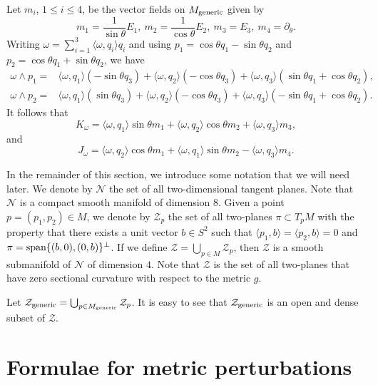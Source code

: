 \documentclass[11pt]{amsart}
\theoremstyle{definition}
\begin{document}
Let $m_i$, $1 \leq i \leq 4$, be the vector fields on $M_{\text{\rm generic}}$ given by
\[
m_1=\frac{1}{\sin\theta} E_1,\ m_2=\frac{1}{\cos\theta} E_2,\ m_3=E_3,\ m_4=\partial_\theta.
\] 
Writing $\omega=\sum_{i=1}^3 \langle \omega, q_i\rangle q_i$ and using $p_1=\cos\theta q_1-\sin\theta q_2$ and $p_2=\cos\theta q_1+\sin\theta q_2$, we have
\begin{align*}
\omega\wedge p_1=& \langle \omega,q_1\rangle (-\sin\theta q_3)+\langle \omega,q_2\rangle (-\cos\theta q_3)+\langle \omega,q_3\rangle (\sin\theta q_1+\cos\theta q_2),\\
\omega\wedge p_2=& \langle \omega,q_1\rangle (\sin\theta q_3)+\langle \omega,q_2\rangle(-\cos\theta q_3)+\langle \omega,q_3\rangle(-\sin\theta q_1+\cos\theta q_2).
\end{align*}
It follows that
\begin{equation}\label{K.omega.in.mi}
K_\omega=\langle \omega,q_1\rangle\sin\theta m_1+\langle \omega,q_2\rangle\cos\theta m_2+\langle \omega,q_3\rangle m_3,    
\end{equation}
and
\begin{equation}\label{J.omega.in.mi}
J_\omega= \langle \omega,q_2\rangle\cos\theta m_1+\langle \omega,q_1\rangle\sin\theta m_2-\langle \omega,q_3\rangle m_4.    
\end{equation}

In the remainder of this section, we introduce some notation that we will need later. We denote by $\mathcal{N}$ the set of all two-dimensional tangent planes. Note that $\mathcal{N}$ is a compact smooth manifold of dimension $8$. Given a point $p = (p_1,p_2) \in M$, we denote by $\mathcal{Z}_p$ the set of all two-planes $\pi \subset T_p M$ with the property that there exists a unit vector $b \in S^2$ such that $\langle p_1,b \rangle = \langle p_2,b \rangle = 0$ and $\pi = \text{\rm span}\{(b,0),(0,b)\}^\perp$. If we define $\mathcal{Z} = \bigcup_{p \in M} \mathcal{Z}_p$, then $\mathcal{Z}$ is a smooth submanifold of $\mathcal{N}$ of dimension $4$. Note that $\mathcal{Z}$ is the set of all two-planes that have zero sectional curvature with respect to the metric $g$.

Let $\mathcal{Z}_{\text{\rm generic}} = \bigcup_{p \in M_{\text{\rm generic}}} \mathcal{Z}_p$. It is easy to see that $\mathcal{Z}_{\text{\rm generic}}$ is an open and dense subset of $\mathcal{Z}$. \\

\section{Formulae for metric perturbations}
\end{document}
